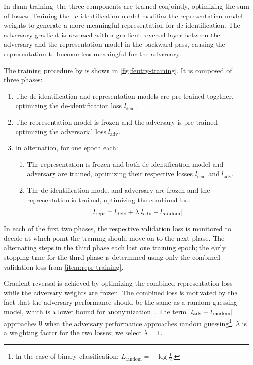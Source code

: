 %
In \ac{dann} training, the three components are trained conjointly, optimizing the sum of losses.
%
Training the de-identification model modifies the representation model weights to generate a more meaningful representation for de-identification.
%
The adversary gradient is reversed with a gradient reversal layer between the adversary and the representation model in the backward pass, causing the representation to become less meaningful for the adversary.

%
The training procedure by \citet{feutry2018learning} is shown in \cref{fig:feutry-training}.
%
It is composed of three phases:
%
\begin{enumerate}[label=P\arabic*.,ref=P\arabic*]
    \item The de-identification and representation models are pre-trained together, optimizing the de-identification loss $l_{\text{deid}}$.
    \item The representation model is frozen and the adversary is pre-trained, optimizing the adversarial loss $l_{\text{adv}}$.
    \item In alternation, for one epoch each:
    \begin{enumerate}
        \item The representation is frozen and both de-identification model and adversary are trained, optimizing their respective losses $l_{\text{deid}}$ and $l_{\text{adv}}$.
        \item The de-identification model and adversary are frozen and the representation is trained, optimizing the combined loss
        \begin{align}
            l_{\text{repr}} = l_{\text{deid}} + \lambda \lvert l_{\text{adv}} - l_{\text{random}}\rvert
        \end{align}
        \label{item:repr-training}
    \end{enumerate}
\end{enumerate}
%
In each of the first two phases, the respective validation loss is monitored to decide at which point the training should move on to the next phase.
%
The alternating steps in the third phase each last one training epoch; the early stopping time for the third phase is determined using only the combined validation loss from \ref{item:repr-training}.

%
Gradient reversal is achieved by optimizing the combined representation loss while the adversary weights are frozen.
%
The combined loss is motivated by the fact that the adversary performance should be the same as a random guessing model, which is a lower bound for anonymization~\citep{feutry2018learning}.
%
The term $\lvert l_{\text{adv}} - l_{\text{random}}\rvert$ approaches $0$ when the adversary performance approaches random guessing\footnote{In the case of binary classification: $L_{\text{random}} = -\log \frac{1}{2}$.}.
%
$\lambda$ is a weighting factor for the two losses; we select $\lambda=1$.

